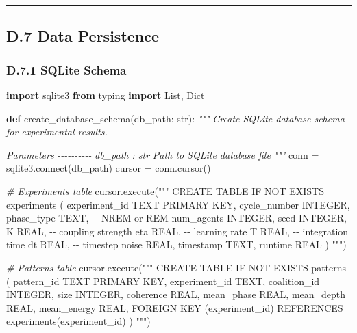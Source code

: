 \documentclass[
]{article}
\newenvironment{Shaded}{}{}
\newcommand{\BuiltInTok}[1]{\textcolor[rgb]{0.00,0.50,0.00}{#1}}
\newcommand{\CommentTok}[1]{\textcolor[rgb]{0.38,0.63,0.69}{\textit{#1}}}
\newcommand{\ExtensionTok}[1]{#1}
\newcommand{\ImportTok}[1]{\textcolor[rgb]{0.00,0.50,0.00}{\textbf{#1}}}
\newcommand{\KeywordTok}[1]{\textcolor[rgb]{0.00,0.44,0.13}{\textbf{#1}}}
\newcommand{\NormalTok}[1]{#1}
\newcommand{\OperatorTok}[1]{\textcolor[rgb]{0.40,0.40,0.40}{#1}}
\newcommand{\StringTok}[1]{\textcolor[rgb]{0.25,0.44,0.63}{#1}}
\begin{document}
\begin{center}\rule{0.5\linewidth}{0.5pt}\end{center}

\subsection{D.7 Data Persistence}\label{d.7-data-persistence}

\subsubsection{D.7.1 SQLite Schema}\label{d.7.1-sqlite-schema}

\begin{Shaded}
\begin{Highlighting}[]
\ImportTok{import}\NormalTok{ sqlite3}
\ImportTok{from}\NormalTok{ typing }\ImportTok{import}\NormalTok{ List, Dict}

\KeywordTok{def}\NormalTok{ create\_database\_schema(db\_path: }\BuiltInTok{str}\NormalTok{):}
    \CommentTok{"""}
\CommentTok{    Create SQLite database schema for experimental results.}

\CommentTok{    Parameters}
\CommentTok{    {-}{-}{-}{-}{-}{-}{-}{-}{-}{-}}
\CommentTok{    db\_path : str}
\CommentTok{        Path to SQLite database file}
\CommentTok{    """}
\NormalTok{    conn }\OperatorTok{=}\NormalTok{ sqlite3.}\ExtensionTok{connect}\NormalTok{(db\_path)}
\NormalTok{    cursor }\OperatorTok{=}\NormalTok{ conn.cursor()}

    \CommentTok{\# Experiments table}
\NormalTok{    cursor.execute(}\StringTok{"""}
\StringTok{        CREATE TABLE IF NOT EXISTS experiments (}
\StringTok{            experiment\_id TEXT PRIMARY KEY,}
\StringTok{            cycle\_number INTEGER,}
\StringTok{            phase\_type TEXT,  {-}{-} \textquotesingle{}NREM\textquotesingle{} or \textquotesingle{}REM\textquotesingle{}}
\StringTok{            num\_agents INTEGER,}
\StringTok{            seed INTEGER,}
\StringTok{            K REAL,           {-}{-} coupling strength}
\StringTok{            eta REAL,         {-}{-} learning rate}
\StringTok{            T REAL,           {-}{-} integration time}
\StringTok{            dt REAL,          {-}{-} timestep}
\StringTok{            noise REAL,}
\StringTok{            timestamp TEXT,}
\StringTok{            runtime REAL}
\StringTok{        )}
\StringTok{    """}\NormalTok{)}

    \CommentTok{\# Patterns table}
\NormalTok{    cursor.execute(}\StringTok{"""}
\StringTok{        CREATE TABLE IF NOT EXISTS patterns (}
\StringTok{            pattern\_id TEXT PRIMARY KEY,}
\StringTok{            experiment\_id TEXT,}
\StringTok{            coalition\_id INTEGER,}
\StringTok{            size INTEGER,}
\StringTok{            coherence REAL,}
\StringTok{            mean\_phase REAL,}
\StringTok{            mean\_depth REAL,}
\StringTok{            mean\_energy REAL,}
\StringTok{            FOREIGN KEY (experiment\_id) REFERENCES experiments(experiment\_id)}
\StringTok{        )}
\StringTok{    """}\NormalTok{)}


\end{Highlighting}
\end{Shaded}
\end{document}
